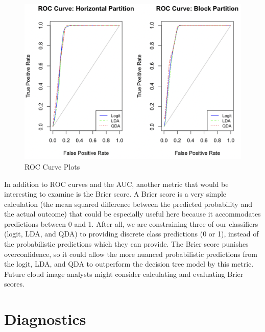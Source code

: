 \documentclass[12pt]{article}
\begin{document}
\begin{figure}[htp]
\caption{ROC Curve Plots}
\includegraphics[width=13cm]{Fig4.png}
\centering
\end{figure}
\newline
\newline
\newline
\noindent In addition to ROC curves and the AUC, another metric that would be interesting to examine is the Brier score. A Brier score is a very simple calculation (the mean squared difference between the predicted probability and the actual outcome) that could be especially useful here because it accommodates predictions between 0 and 1. After all, we are constraining three of our classifiers (logit, LDA, and QDA) to providing discrete class predictions (0 or 1), instead of the probabilistic predictions which they can provide. The Brier score punishes overconfidence, so it could allow the more nuanced probabilistic predictions from the logit, LDA, and QDA to outperform the decision tree model by this metric.  Future cloud image analysts might consider calculating and evaluating Brier scores.         

\section{Diagnostics}
\end{document}
